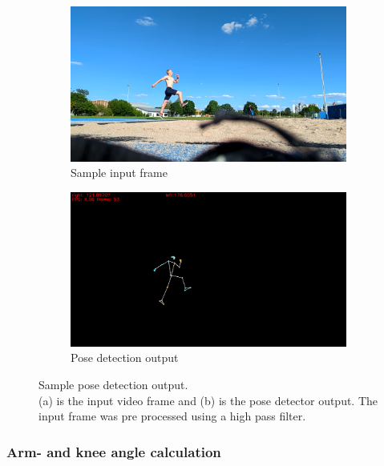 \begin{figure}[h!]
    \begin{subfigure}[b]{0.47\textwidth}
        \includegraphics*[scale=0.1]{takeoff_good.png}
        \caption{Sample input frame}
        \label{subfig:input_frame}
    \end{subfigure}
    \hfill
    \begin{subfigure}[b]{0.5\textwidth}
        \includegraphics*[scale=0.185]{takeoff_keypoints.png}
        \caption{Pose detection output}
        \label{subfig:output_pose_detection_result}
    \end{subfigure}
    \caption[Pose detection example]{Sample pose detection output.\\
    (a) is the input video frame and (b) is the pose detector output.
    The input frame was pre processed using a high pass filter.}
    \label{fig:4_pose_detection_in_out}
\end{figure}

\subsubsection*{Arm- and knee angle calculation}
